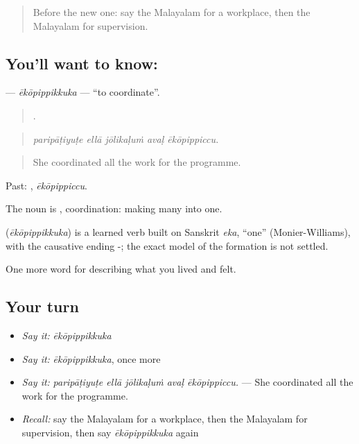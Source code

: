 \label{lesson:ML-C550-ekopippikkuka}



\begin{quote}
Before the new one: say the Malayalam for a workplace, then the Malayalam for supervision.
\end{quote}

\subsection*{You'll want to know: }
\textbf{} — \emph{ēkōpippikkuka} — \textquotedblleft{}to coordinate\textquotedblright{}.

\begin{quote}
    .
\end{quote}

\begin{quote}
\emph{paripāṭiyuṭe ellā jōlikaḷuṁ avaḷ ēkōpippiccu.}
\end{quote}

\begin{quote}
She coordinated all the work for the programme.
\end{quote}

Past: , \emph{ēkōpippiccu}.

The noun is , coordination: making many into one.

\begin{cousinweb}
\textbf{} (\emph{ēkōpippikkuka}) is a learned verb built on Sanskrit \emph{eka}, \textquotedblleft{}one\textquotedblright{} (Monier-Williams), with the causative ending -; the exact model of the formation is not settled.
\end{cousinweb}

\begin{grammarlens}[title={What you've built}]
One more word for describing what you lived and felt.
\end{grammarlens}

\subsection*{Your turn}
\begin{itemize}
\raggedright
  \item \emph{Say it:} \emph{ēkōpippikkuka}
  \item \emph{Say it:} \emph{ēkōpippikkuka}, once more
  \item \emph{Say it:} \emph{paripāṭiyuṭe ellā jōlikaḷuṁ avaḷ ēkōpippiccu.} — She coordinated all the work for the programme.
  \item \emph{Recall:} say the Malayalam for a workplace, then the Malayalam for supervision, then say \emph{ēkōpippikkuka} again
\end{itemize}

